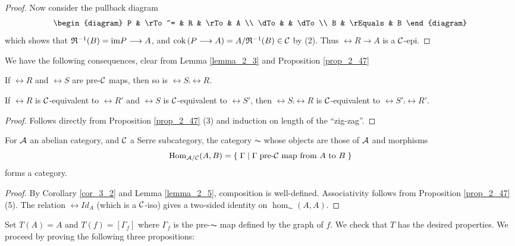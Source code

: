 \begin{proof}
Now consider the pullback diagram
\[
\begin{diagram}
P    & \rTo^=   & R    & \rTo & A \\
\dTo &          & \dTo \\
B    & \rEquals & B
\end{diagram}
\]
which shows that $\mathfrak R^{-1}(B) = \mathrm{im} P \longrightarrow A$, and $\mathrm{cok}\, (P 
\longrightarrow A) = A/\mathfrak R^{-1}(B) \in \mathcal{C}$ by (2). Thus $\rel{R} \to 
A$ is a $\mathcal{C}$-epi.
\end{proof}

We have the following consequences, clear from Lemma 
\ref{lemma_2_3} and Proposition \ref{prop_2_47}

\begin{cor}\label{cor_3_2}
If $\rel{R}$ and $\rel{S}$ are pre-$\mathcal{C}$ maps, then so is
$\rel{S} \comp \rel{R}$.
\end{cor}

\begin{lem}\label{lemma_2_5}
If $\rel{R}$ is $\mathcal{C}$-equivalent to $\rel{R}'$ and $\rel{S}$ is 
$\mathcal{C}$-equivalent to $\rel{S}'$, then $\rel{S} \comp \rel{R}$ is
$\mathcal{C}$-equivalent to $\rel{S}' \comp \rel{R}'$.
\end{lem}
\begin{proof}
Follows directly from Proposition \ref{prop_2_47} (3) and induction
on length of the ``zig-zag''.
\end{proof}

\begin{prop}
For $\mathcal{A}$ an abelian category, and $\mathcal{C}$ a Serre 
subcategory, the category $\AC$ whose objects are those of 
$\mathcal{A}$ and morphisms
\[
\mathrm{Hom}_{\mathcal{A}/\mathcal{C}}(A, B) = \{\; \Gamma\; |\; \Gamma\;
\textrm{pre-}\mathcal{C}\textrm{ map from }A\textrm{ to }B \;\}
\] 
forms a category.
\end{prop}
\begin{proof}
By Corollary \ref{cor_3_2} and Lemma \ref{lemma_2_5}, composition 
is well-defined. Associativity follows from Proposition 
\ref{prop_2_47} (5). The relation $\rel{Id}_A$ (which is a 
$\mathcal{C}$-iso) gives a two-sided identity on $\hom_{\AC}(A, A)$.
\end{proof}

Set $T(A) = A$ and $T(f) = [\Gamma_f]$ where $\Gamma_f$ is the
pre-$\AC$ map defined by the graph of $f$. We check that $T$ has 
the desired properties. We proceed by proving the following three 
propositions:

